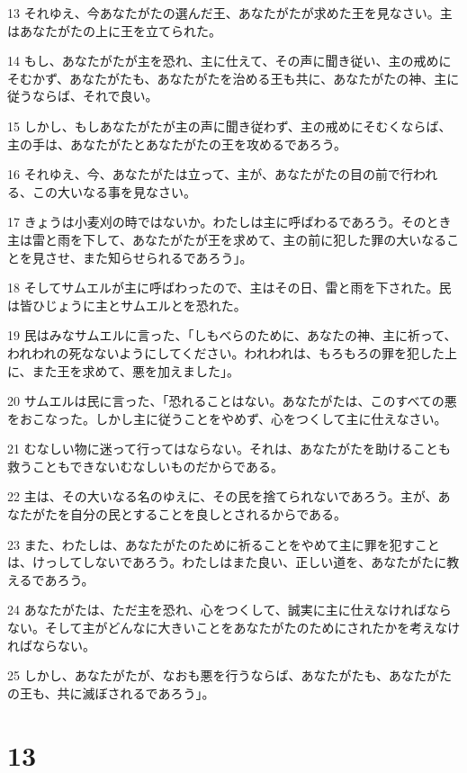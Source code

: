 \par 13 それゆえ、今あなたがたの選んだ王、あなたがたが求めた王を見なさい。主はあなたがたの上に王を立てられた。
\par 14 もし、あなたがたが主を恐れ、主に仕えて、その声に聞き従い、主の戒めにそむかず、あなたがたも、あなたがたを治める王も共に、あなたがたの神、主に従うならば、それで良い。
\par 15 しかし、もしあなたがたが主の声に聞き従わず、主の戒めにそむくならば、主の手は、あなたがたとあなたがたの王を攻めるであろう。
\par 16 それゆえ、今、あなたがたは立って、主が、あなたがたの目の前で行われる、この大いなる事を見なさい。
\par 17 きょうは小麦刈の時ではないか。わたしは主に呼ばわるであろう。そのとき主は雷と雨を下して、あなたがたが王を求めて、主の前に犯した罪の大いなることを見させ、また知らせられるであろう」。
\par 18 そしてサムエルが主に呼ばわったので、主はその日、雷と雨を下された。民は皆ひじょうに主とサムエルとを恐れた。
\par 19 民はみなサムエルに言った、「しもべらのために、あなたの神、主に祈って、われわれの死なないようにしてください。われわれは、もろもろの罪を犯した上に、また王を求めて、悪を加えました」。
\par 20 サムエルは民に言った、「恐れることはない。あなたがたは、このすべての悪をおこなった。しかし主に従うことをやめず、心をつくして主に仕えなさい。
\par 21 むなしい物に迷って行ってはならない。それは、あなたがたを助けることも救うこともできないむなしいものだからである。
\par 22 主は、その大いなる名のゆえに、その民を捨てられないであろう。主が、あなたがたを自分の民とすることを良しとされるからである。
\par 23 また、わたしは、あなたがたのために祈ることをやめて主に罪を犯すことは、けっしてしないであろう。わたしはまた良い、正しい道を、あなたがたに教えるであろう。
\par 24 あなたがたは、ただ主を恐れ、心をつくして、誠実に主に仕えなければならない。そして主がどんなに大きいことをあなたがたのためにされたかを考えなければならない。
\par 25 しかし、あなたがたが、なおも悪を行うならば、あなたがたも、あなたがたの王も、共に滅ぼされるであろう」。

\chapter{13}


